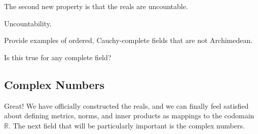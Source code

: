 \documentclass{article}
\begin{document}
      The second new property is that the reals are uncountable. 

      \begin{theorem}
        Uncountability. 
      \end{theorem} 

      Provide examples of ordered, Cauchy-complete fields that are not Archimedean. 

      \begin{theorem}
        Is this true for any complete field? 
      \end{theorem}

      \begin{theorem}[Denseness]
        
      \end{theorem}
    
  \subsection{Complex Numbers} 

    Great! We have officially constructed the reals, and we can finally feel satisfied about defining metrics, norms, and inner products as mappings to the codomain $\mathbb{R}$. The next field that will be particularly important is the complex numbers. 
\end{document}
